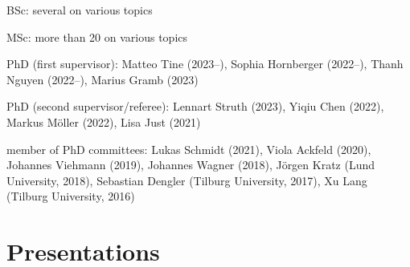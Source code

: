 \documentclass[a4paper]{article}
\renewenvironment{itemize}{
  \begin{list}{}{
    \setlength{\leftmargin}{1.5em}
  }
}{
  \end{list}
}
\begin{document}
\begin{itemize}
\item BSc: several on various topics
\item MSc: more than 20 on various topics
\item PhD (first supervisor): Matteo Tine (2023--), Sophia Hornberger (2022--), Thanh Nguyen (2022--), Marius Gramb (2023)
\item PhD (second supervisor/referee):  Lennart Struth (2023), Yiqiu Chen (2022), Markus M\"oller (2022), Lisa Just (2021)
\item member of PhD committees: Lukas Schmidt (2021), Viola Ackfeld (2020), Johannes Viehmann (2019), Johannes Wagner (2018), J\"orgen Kratz (Lund University, 2018), Sebastian Dengler (Tilburg University, 2017), Xu Lang (Tilburg University, 2016)
\end{itemize}

\section*{Presentations}
\end{document}
